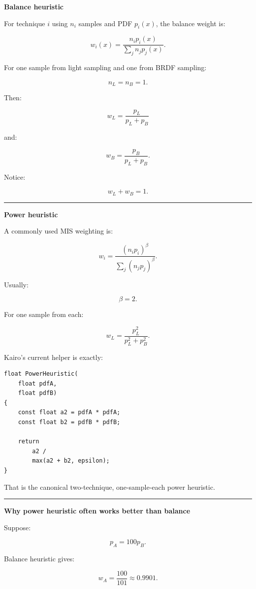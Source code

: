 \textbf{Balance heuristic}

For technique \(i\) using \(n_i\) samples and PDF \(p_i(x)\), the balance weight is:

\[
\boxed{
w_i(x)
=
\frac{
n_i p_i(x)
}{
\sum_j n_jp_j(x)
}.
}
\]

For one sample from light sampling and one from BRDF sampling:

\[
n_L=n_B=1.
\]

Then:

\[
\boxed{
w_L
=
\frac{
p_L
}{
p_L+p_B
}
}
\]

and:

\[
\boxed{
w_B
=
\frac{
p_B
}{
p_L+p_B
}.
}
\]

Notice:

\[
w_L+w_B=1.
\]

\begin{center}\rule{0.5\linewidth}{0.5pt}\end{center}

\textbf{Power heuristic}

A commonly used MIS weighting is:

\[
\boxed{
w_i
=
\frac{
(n_ip_i)^\beta
}{
\sum_j(n_jp_j)^\beta
}.
}
\]

Usually:

\[
\beta=2.
\]

For one sample from each:

\[
\boxed{
w_L
=
\frac{
p_L^2
}{
p_L^2+p_B^2
}.
}
\]

Kairo's current helper is exactly:

\begin{verbatim}
float PowerHeuristic(
    float pdfA,
    float pdfB)
{
    const float a2 = pdfA * pdfA;
    const float b2 = pdfB * pdfB;

    return
        a2 /
        max(a2 + b2, epsilon);
}
\end{verbatim}

That is the canonical two-technique, one-sample-each power heuristic.

\begin{center}\rule{0.5\linewidth}{0.5pt}\end{center}

\textbf{Why power heuristic often works better than balance}

Suppose:

\[
p_A=100p_B.
\]

Balance heuristic gives:

\[
w_A
=
\frac{100}{101}
\approx0.9901.
\]


